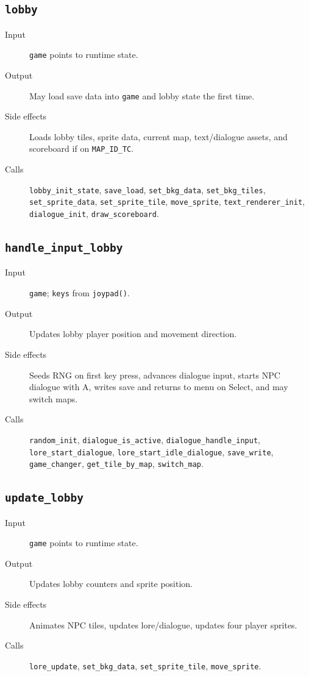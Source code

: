 \subsection*{\texttt{lobby}}
\begin{description}
  \item[Input] \texttt{game} points to runtime state.
  \item[Output] May load save data into \texttt{game} and lobby state the first time.
  \item[Side effects] Loads lobby tiles, sprite data, current map, text/dialogue assets, and scoreboard if on \texttt{MAP\_ID\_TC}.
  \item[Calls] \texttt{lobby\_init\_state}, \texttt{save\_load}, \texttt{set\_bkg\_data}, \texttt{set\_bkg\_tiles}, \texttt{set\_sprite\_data}, \texttt{set\_sprite\_tile}, \texttt{move\_sprite}, \texttt{text\_renderer\_init}, \texttt{dialogue\_init}, \texttt{draw\_scoreboard}.
\end{description}

\subsection*{\texttt{handle\_input\_lobby}}
\begin{description}
  \item[Input] \texttt{game}; \texttt{keys} from \texttt{joypad()}.
  \item[Output] Updates lobby player position and movement direction.
  \item[Side effects] Seeds RNG on first key press, advances dialogue input, starts NPC dialogue with A, writes save and returns to menu on Select, and may switch maps.
  \item[Calls] \texttt{random\_init}, \texttt{dialogue\_is\_active}, \texttt{dialogue\_handle\_input}, \texttt{lore\_start\_dialogue}, \texttt{lore\_start\_idle\_dialogue}, \texttt{save\_write}, \texttt{game\_changer}, \texttt{get\_tile\_by\_map}, \texttt{switch\_map}.
\end{description}

\subsection*{\texttt{update\_lobby}}
\begin{description}
  \item[Input] \texttt{game} points to runtime state.
  \item[Output] Updates lobby counters and sprite position.
  \item[Side effects] Animates NPC tiles, updates lore/dialogue, updates four player sprites.
  \item[Calls] \texttt{lore\_update}, \texttt{set\_bkg\_data}, \texttt{set\_sprite\_tile}, \texttt{move\_sprite}.
\end{description}

